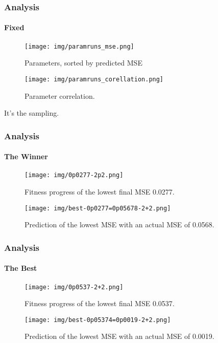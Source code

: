 \documentclass{beamer}
\begin{document}
\begin{frame}[fragile]
\frametitle{Analysis}
\framesubtitle{Fixed}
\begin{figure}[H]

\begin{minipage}{.5\textwidth}
  \centering
  \texttt{[image: img/paramruns\_mse.png]}
  \caption{Parameters, sorted by predicted MSE}
\end{minipage}%
\begin{minipage}{.5\textwidth}
  \centering
  \texttt{[image: img/paramruns\_corellation.png]}
  \caption{Parameter correlation.}
\end{minipage}%
\end{figure}

\hbox{}
It's the sampling.

\end{frame}


\begin{frame}[fragile]
\frametitle{Analysis}
\framesubtitle{The Winner}
\begin{figure}[H]

\begin{minipage}{.5\textwidth}
  \centering
  \texttt{[image: img/0p0277-2p2.png]}
  \caption{Fitness progress of the lowest final MSE 0.0277.}
\end{minipage}%
\begin{minipage}{.5\textwidth}
  \centering
  \texttt{[image: img/best-0p0277=0p05678-2+2.png]}
  \caption{Prediction of the lowest MSE with an actual MSE of 0.0568.}
\end{minipage}%
\end{figure}

\end{frame}

\begin{frame}[fragile]
\frametitle{Analysis}
\framesubtitle{The Best}
\begin{figure}[H]

\begin{minipage}{.5\textwidth}
  \centering
  \texttt{[image: img/0p0537-2+2.png]}
  \caption{Fitness progress of the lowest final MSE 0.0537.}
\end{minipage}%
\begin{minipage}{.5\textwidth}
  \centering
  \texttt{[image: img/best-0p05374=0p0019-2+2.png]}
  \caption{Prediction of the lowest MSE with an actual MSE of 0.0019.}
\end{minipage}%
\end{figure}
\end{frame}
\end{document}
